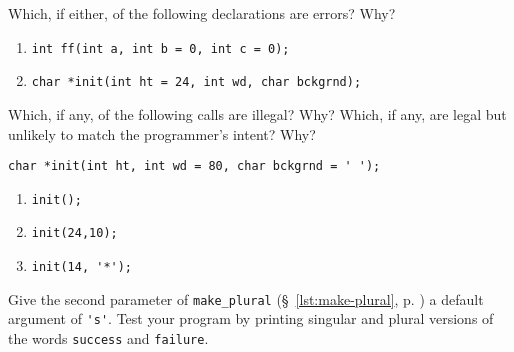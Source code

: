 %
%
\begin{question}
Which, if either, of the following declarations are errors?
Why?
\begin{enumerate}[label=(\alph*)]
^^I\item \verb|int ff(int a, int b = 0, int c = 0);|
^^I\item \verb|char *init(int ht = 24, int wd, char bckgrnd);|
\end{enumerate}
\end{question}

\begin{question}
Which, if any, of the following calls are illegal? Why? Which,
if any, are legal but unlikely to match the programmer’s intent? Why?
\begin{lstlisting}
char *init(int ht, int wd = 80, char bckgrnd = ' ');
\end{lstlisting}
\begin{enumerate}[label=(\alph*)]
^^I\item \verb|init();|
^^I\item \verb|init(24,10);|
^^I\item \verb|init(14, '*');|
\end{enumerate}
\end{question}

\begin{question}
Give the second parameter of \verb|make_plural| (\S~\ref{lst:make-plural}, p.
\pageref{lst:make-plural}) a default argument of \verb|'s'|. Test your program by printing singular and
plural versions of the words \verb|success| and \verb|failure|.
\end{question}

